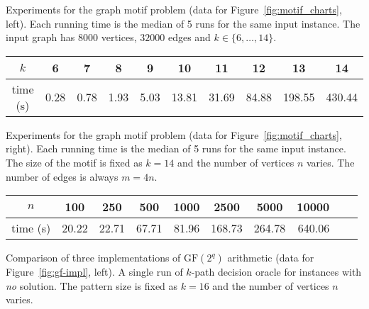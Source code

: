 \documentclass[11pt]{article}
\newcommand{\field}[1]{{\textrm{GF}}({#1})}
\begin{document}
Experiments for the graph motif problem  (data for Figure~\ref{fig:motif_charts}, left).
Each running time is the median of 5 runs for the same input instance.
The input graph has $8000$ vertices, $32000$ edges and $k\in\{6,\ldots,14\}$.

{\footnotesize
\begin{center}
\begin{tabular}{|c|r|r|r|r|r|r|r|r|r|}\hline
\multicolumn{1}{|c|}{$k$} & \multicolumn{1}{|c|}{6}  & \multicolumn{1}{|c|}{7}  & \multicolumn{1}{|c|}{8}  & \multicolumn{1}{|c|}{9}  & \multicolumn{1}{|c|}{10}  & \multicolumn{1}{|c|}{11}  & \multicolumn{1}{|c|}{12}  & \multicolumn{1}{|c|}{13}  & \multicolumn{1}{|c|}{14} \\\hline
time (s) & 0.28 & 0.78 & 1.93 & 5.03 & 13.81 & 31.69 & 84.88 & 198.55 & 430.44\\\hline
\end{tabular}
\end{center}
}

Experiments for the graph motif problem  (data for Figure~\ref{fig:motif_charts}, right).
Each running time is the median of 5 runs for the same input instance.
The size of the motif is fixed as $k=14$ and the number of vertices $n$ varies. The number of edges is always $m=4n$.

{\footnotesize
\begin{center}
\begin{tabular}{|c|r|r|r|r|r|r|r|r|r|}\hline
\multicolumn{1}{|c|}{$n$} & \multicolumn{1}{|c|}{100}  & \multicolumn{1}{|c|}{250}  & \multicolumn{1}{|c|}{500}  & \multicolumn{1}{|c|}{1000}  & \multicolumn{1}{|c|}{2500}  & \multicolumn{1}{|c|}{5000}  & \multicolumn{1}{|c|}{10000} \\\hline
time (s) & 20.22 & 22.71 & 67.71 & 81.96 & 168.73 & 264.78 & 640.06\\\hline
\end{tabular}
\end{center}
}
 

Comparison of three implementations of $\field{2^q}$ arithmetic (data for Figure~\ref{fig:gf-impl}, left).
A single run of $k$-path decision oracle for instances with {\em no} solution. 
The pattern size is fixed as $k=16$ and the number of vertices $n$ varies.
\end{document}
